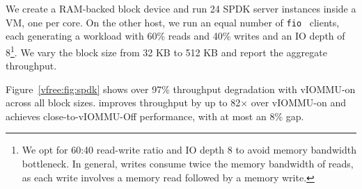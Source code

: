 We create a RAM-backed block device and run 24 SPDK server instances inside a VM, one per core.
On the other host, we run an equal number of \texttt{fio}~\cite{fio} clients, 
    each generating a workload with 60\% reads and 40\% writes and an IO depth of 8\footnote{We opt for 60:40 read-write ratio and IO depth 8 to avoid memory bandwidth bottleneck. 
    In general, writes consume twice the memory bandwidth 
    of reads, as each write involves a memory read followed by a memory write.}.
We vary the block size from 32 KB to 512 KB and report the aggregate throughput.

Figure~\ref{vfree:fig:spdk} shows over 97\% throughput degradation 
    with vIOMMU-on across all block sizes.
\vfreebrand improves throughput by up to 82$\times$ over vIOMMU-on and 
    achieves close-to-vIOMMU-Off performance, with at most an 8\% gap.


    

